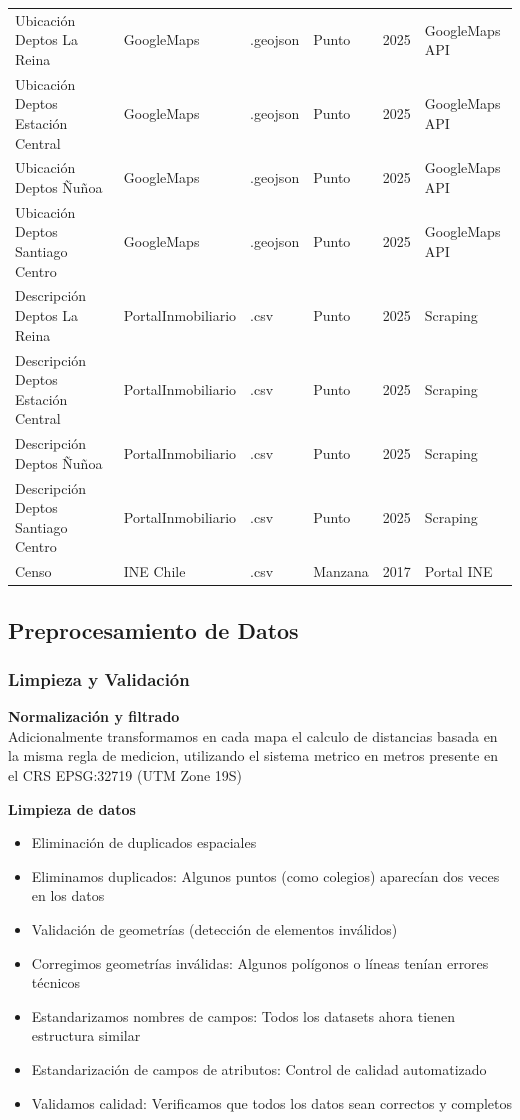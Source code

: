 \begin{table}[H]
\begin{tabular}{@{}llllll@{}}
Ubicación Deptos La Reina & GoogleMaps & .geojson & Punto & 2025 & GoogleMaps API \\
Ubicación Deptos Estación Central & GoogleMaps & .geojson & Punto & 2025 & GoogleMaps API \\
Ubicación Deptos Ñuñoa & GoogleMaps & .geojson & Punto & 2025 & GoogleMaps API \\
Ubicación Deptos Santiago Centro & GoogleMaps & .geojson & Punto & 2025 & GoogleMaps API \\
Descripción Deptos La Reina & PortalInmobiliario & .csv & Punto & 2025 & Scraping \\
Descripción Deptos Estación Central & PortalInmobiliario & .csv & Punto & 2025 & Scraping \\
Descripción Deptos Ñuñoa & PortalInmobiliario & .csv & Punto & 2025 & Scraping \\
Descripción Deptos Santiago Centro & PortalInmobiliario & .csv & Punto & 2025 & Scraping \\
Censo & INE Chile & .csv & Manzana & 2017 & Portal INE \\
\bottomrule
\end{tabular}
\end{table}

\subsection{Preprocesamiento de Datos}

\subsubsection{Limpieza y Validación}
\textbf{Normalización y filtrado}\\
Adicionalmente transformamos en cada mapa el calculo de distancias basada en la misma regla de medicion, utilizando el sistema metrico en metros presente en el CRS EPSG:32719 (UTM Zone 19S)

\textbf{Limpieza de datos}
\begin{itemize}
\item Eliminación de duplicados espaciales
\item Eliminamos duplicados: Algunos puntos (como colegios) aparecían dos veces en los datos
\item Validación de geometrías (detección de elementos inválidos)
\item Corregimos geometrías inválidas: Algunos polígonos o líneas tenían errores técnicos
\item Estandarizamos nombres de campos: Todos los datasets ahora tienen estructura similar
\item Estandarización de campos de atributos: Control de calidad automatizado
\item Validamos calidad: Verificamos que todos los datos sean correctos y completos
\end{itemize}

